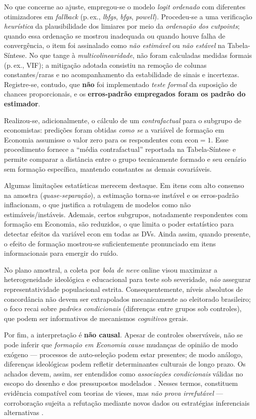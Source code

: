 No que concerne ao ajuste, empregou-se o modelo \textit{logit ordenado} com diferentes otimizadores em \textit{fallback} (p.\,ex., \textit{lbfgs}, \textit{bfgs}, \textit{powell}). Procedeu-se a uma verificação \textit{heurística} da plausibilidade dos limiares por meio da \textit{ordenação dos cutpoints}; quando essa ordenação se mostrou inadequada ou quando houve falha de convergência, o item foi assinalado como \textit{não estimável} ou \textit{não estável} na Tabela-Síntese. No que tange à \textit{multicolinearidade}, não foram calculadas medidas formais (p.\,ex., VIF); a mitigação adotada consistiu na remoção de colunas constantes/raras e no acompanhamento da estabilidade de sinais e incertezas. Registre-se, contudo, que \textbf{não} foi implementado \textit{teste formal} da suposição de chances proporcionais, e os \textbf{erros-padrão empregados foram os padrão do estimador}.

Realizou-se, adicionalmente, o cálculo de um \textit{contrafactual} para o subgrupo de economistas: predições foram obtidas \textit{como se} a variável de formação em Economia assumisse o valor zero para os respondentes com \(\mathrm{econ}=1\). Esse procedimento fornece a ``média contrafactual'' reportada na Tabela-Síntese e permite comparar a distância entre o grupo tecnicamente formado e seu cenário sem formação específica, mantendo constantes as demais covariáveis.

Algumas limitações estatísticas merecem destaque. Em itens com alto consenso na amostra (\textit{quase-separação}), a estimação torna-se instável e os erros-padrão inflacionam, o que justifica a rotulagem de modelos como não estimáveis/instáveis. Ademais, certos subgrupos, notadamente respondentes com formação em Economia, são reduzidos, o que limita o poder estatístico para detectar efeitos da variável \(\mathrm{econ}\) em todas as DVs. Ainda assim, quando presente, o efeito de formação mostrou-se suficientemente pronunciado em itens informacionais para emergir do ruído.

No plano amostral, a coleta por \textit{bola de neve} online visou maximizar a heterogeneidade ideológica e educacional para teste sob severidade, \textit{não} assegurar representatividade populacional estrita. Consequentemente, níveis absolutos de concordância não devem ser extrapolados mecanicamente ao eleitorado brasileiro; o foco recai sobre \textit{padrões condicionais} (diferenças entre grupos sob controles), que podem ser informativos de mecanismos \textit{cognitivos} gerais. 

Por fim, a interpretação é \textbf{não causal}. Apesar de controles observáveis, não se pode inferir que \textit{formação em Economia} \textit{cause} mudanças de opinião de modo exógeno — processos de auto-seleção podem estar presentes; de modo análogo, diferenças ideológicas podem refletir determinantes culturais de longo prazo. Os achados devem, assim, ser entendidos como \textit{associações condicionais} válidas no escopo do desenho e dos pressupostos modelados \cite{hausman2008}. Nesses termos, constituem evidência compatível com teorias de vieses, mas \textit{não prova irrefutável} — corroboração sujeita a refutação mediante novos dados ou estratégias inferenciais alternativas \cite{popperlogic}.

